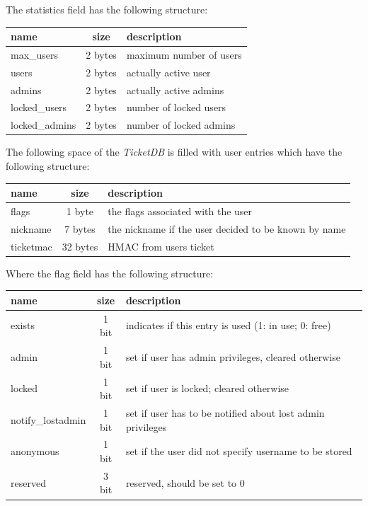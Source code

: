 The statistics field has the following structure:\\
\begin{tabular}{|l|c|l|} \hline
name & size & description \\ \hline 
max\_users     & 2 bytes & maximum number of users \\
users          & 2 bytes & actually active user \\
admins         & 2 bytes & actually active admins \\
locked\_users  & 2 bytes & number of locked users \\
locked\_admins & 2 bytes & number of locked admins \\ \hline
\end{tabular} 

The following space of the \textit{TicketDB} is filled with user entries which have the following structure:\\
\begin{tabular}{|l|c|l|} \hline
name & size & description \\ \hline 
flags      &  1 byte  & the flags associated with the user \\
nickname   &  7 bytes & the nickname if the user decided to be known by name \\
ticketmac  & 32 bytes & HMAC from users ticket \\ \hline
\end{tabular} 

Where the flag field has the following structure: \\
\begin{tabular}{|l|c|l|} \hline
name & size & description \\ \hline 
exists            & 1 bit    &  indicates if this entry is used (1: in use; 0: free)\\
admin             & 1 bit & set if user has admin privileges, cleared otherwise \\
locked            & 1 bit & set if user is locked; cleared otherwise \\
notify\_lostadmin & 1 bit & set if user has to be notified about lost admin privileges \\
anonymous         & 1 bit & set if the user did not specify username to be stored \\
reserved          & 3 bit & reserved, should be set to 0\\ \hline
\end{tabular} 


